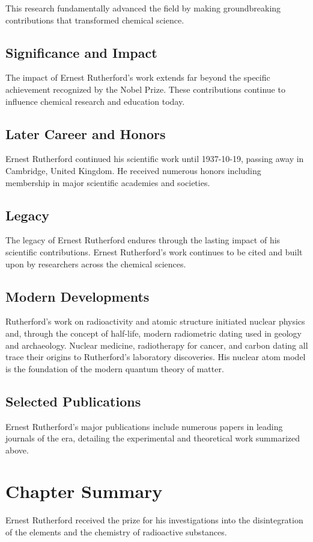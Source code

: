 This research fundamentally advanced the field by making groundbreaking contributions that transformed chemical science.

\subsection*{Significance and Impact}

The impact of Ernest Rutherford's work extends far beyond the specific achievement recognized by the Nobel Prize.
These contributions continue to influence chemical research and education today.

\subsection*{Later Career and Honors}

Ernest Rutherford continued his scientific work until 1937-10-19, passing away in Cambridge, United Kingdom.
He received numerous honors including membership in major scientific academies and societies.

\subsection*{Legacy}

The legacy of Ernest Rutherford endures through the lasting impact of his scientific contributions.
Ernest Rutherford's work continues to be cited and built upon by researchers across the chemical sciences.

\subsection*{Modern Developments}

Rutherford's work on radioactivity and atomic structure initiated nuclear physics and, through the concept of half-life, modern radiometric dating used in geology and archaeology. Nuclear medicine, radiotherapy for cancer, and carbon dating all trace their origins to Rutherford's laboratory discoveries. His nuclear atom model is the foundation of the modern quantum theory of matter.

\subsection*{Selected Publications}

Ernest Rutherford's major publications include numerous papers in leading journals of the era, detailing the experimental and theoretical work summarized above.

\clearpage

\section*{Chapter Summary}

Ernest Rutherford received the prize for his investigations into the disintegration of the elements and the chemistry of radioactive substances.
